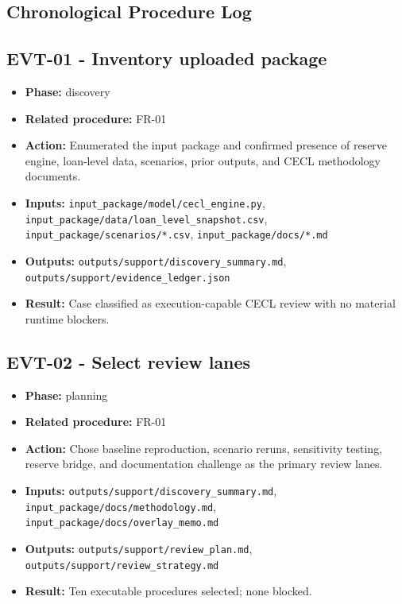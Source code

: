 \documentclass[11pt]{article}
\begin{document}
\subsection*{Chronological Procedure Log}
\subsection*{EVT-01 - Inventory uploaded package}
\begin{itemize}
\item \textbf{Phase:} discovery
\item \textbf{Related procedure:} FR-01
\item \textbf{Action:} Enumerated the input package and confirmed presence of reserve engine, loan-level data, scenarios, prior outputs, and CECL methodology documents.
\item \textbf{Inputs:} \texttt{input\_package/model/cecl\_engine.py}, \texttt{input\_package/data/loan\_level\_snapshot.csv}, \texttt{input\_package/scenarios/*.csv}, \texttt{input\_package/docs/*.md}
\item \textbf{Outputs:} \texttt{outputs/support/discovery\_summary.md}, \texttt{outputs/support/evidence\_ledger.json}
\item \textbf{Result:} Case classified as execution-capable CECL review with no material runtime blockers.
\end{itemize}
\subsection*{EVT-02 - Select review lanes}
\begin{itemize}
\item \textbf{Phase:} planning
\item \textbf{Related procedure:} FR-01
\item \textbf{Action:} Chose baseline reproduction, scenario reruns, sensitivity testing, reserve bridge, and documentation challenge as the primary review lanes.
\item \textbf{Inputs:} \texttt{outputs/support/discovery\_summary.md}, \texttt{input\_package/docs/methodology.md}, \texttt{input\_package/docs/overlay\_memo.md}
\item \textbf{Outputs:} \texttt{outputs/support/review\_plan.md}, \texttt{outputs/support/review\_strategy.md}
\item \textbf{Result:} Ten executable procedures selected; none blocked.
\end{itemize}
\end{document}
